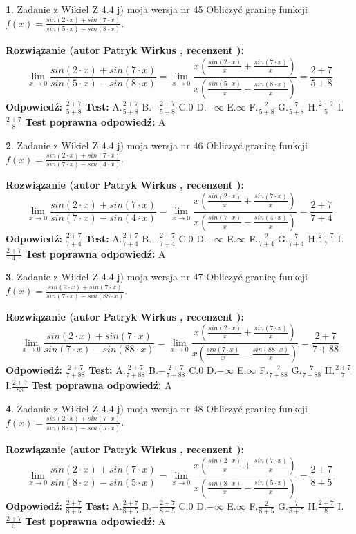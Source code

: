\documentclass[12pt, a4paper]{article}
\theoremstyle{definition} %
\newtheorem{zad}{}
\newcommand{\zadStart}[1]{\begin{zad}#1\newline}
\newcommand{\zadStop}{\end{zad}}
\newcommand{\rozwStart}[2]{\noindent \textbf{Rozwiązanie (autor #1 , recenzent #2): }\newline}
\newcommand{\rozwStop}{\newline}
\newcommand{\odpStart}{\noindent \textbf{Odpowiedź:}\newline}
\newcommand{\odpStop}{\newline}
\newcommand{\testStart}{\noindent \textbf{Test:}\newline}
\newcommand{\testStop}{\newline}
\newcommand{\kluczStart}{\noindent \textbf{Test poprawna odpowiedź:}\newline}
\newcommand{\kluczStop}{\newline}
\begin{document}
\zadStart{Zadanie z Wikieł Z 4.4 j) moja wersja nr 45}
Obliczyć granicę funkcji $f(x)=\frac{sin(2\cdot x) +sin(7\cdot x)}{sin(5\cdot x) -sin(8\cdot x)}$.
\zadStop
\rozwStart{Patryk Wirkus}{}
$$\lim\limits_{x\to 0}\frac{sin(2\cdot x) +sin(7\cdot x)}{sin(5\cdot x) -sin(8\cdot x)}=\lim\limits_{x\to 0}\frac{x(\frac{sin(2\cdot x)}{x}+\frac{sin(7\cdot x)}{x})}{x(\frac{sin(5\cdot x)}{x}-\frac{sin(8\cdot x)}{x})}=\frac{2+7}{5+8}$$
\rozwStop
\odpStart
$\frac{2+7}{5+8}$
\odpStop
\testStart
A.$\frac{2+7}{5+8}$
B.$-\frac{2+7}{5+8}$
C.$0$
D.$-\infty$
E.$\infty$
F.$\frac{2}{5+8}$
G.$\frac{7}{5+8}$
H.$\frac{2+7}{5}$
I.$\frac{2+7}{8}$
\testStop
\kluczStart
A
\kluczStop



\zadStart{Zadanie z Wikieł Z 4.4 j) moja wersja nr 46}
Obliczyć granicę funkcji $f(x)=\frac{sin(2\cdot x) +sin(7\cdot x)}{sin(7\cdot x) -sin(4\cdot x)}$.
\zadStop
\rozwStart{Patryk Wirkus}{}
$$\lim\limits_{x\to 0}\frac{sin(2\cdot x) +sin(7\cdot x)}{sin(7\cdot x) -sin(4\cdot x)}=\lim\limits_{x\to 0}\frac{x(\frac{sin(2\cdot x)}{x}+\frac{sin(7\cdot x)}{x})}{x(\frac{sin(7\cdot x)}{x}-\frac{sin(4\cdot x)}{x})}=\frac{2+7}{7+4}$$
\rozwStop
\odpStart
$\frac{2+7}{7+4}$
\odpStop
\testStart
A.$\frac{2+7}{7+4}$
B.$-\frac{2+7}{7+4}$
C.$0$
D.$-\infty$
E.$\infty$
F.$\frac{2}{7+4}$
G.$\frac{7}{7+4}$
H.$\frac{2+7}{7}$
I.$\frac{2+7}{4}$
\testStop
\kluczStart
A
\kluczStop



\zadStart{Zadanie z Wikieł Z 4.4 j) moja wersja nr 47}
Obliczyć granicę funkcji $f(x)=\frac{sin(2\cdot x) +sin(7\cdot x)}{sin(7\cdot x) -sin(88\cdot x)}$.
\zadStop
\rozwStart{Patryk Wirkus}{}
$$\lim\limits_{x\to 0}\frac{sin(2\cdot x) +sin(7\cdot x)}{sin(7\cdot x) -sin(88\cdot x)}=\lim\limits_{x\to 0}\frac{x(\frac{sin(2\cdot x)}{x}+\frac{sin(7\cdot x)}{x})}{x(\frac{sin(7\cdot x)}{x}-\frac{sin(88\cdot x)}{x})}=\frac{2+7}{7+88}$$
\rozwStop
\odpStart
$\frac{2+7}{7+88}$
\odpStop
\testStart
A.$\frac{2+7}{7+88}$
B.$-\frac{2+7}{7+88}$
C.$0$
D.$-\infty$
E.$\infty$
F.$\frac{2}{7+88}$
G.$\frac{7}{7+88}$
H.$\frac{2+7}{7}$
I.$\frac{2+7}{88}$
\testStop
\kluczStart
A
\kluczStop



\zadStart{Zadanie z Wikieł Z 4.4 j) moja wersja nr 48}
Obliczyć granicę funkcji $f(x)=\frac{sin(2\cdot x) +sin(7\cdot x)}{sin(8\cdot x) -sin(5\cdot x)}$.
\zadStop
\rozwStart{Patryk Wirkus}{}
$$\lim\limits_{x\to 0}\frac{sin(2\cdot x) +sin(7\cdot x)}{sin(8\cdot x) -sin(5\cdot x)}=\lim\limits_{x\to 0}\frac{x(\frac{sin(2\cdot x)}{x}+\frac{sin(7\cdot x)}{x})}{x(\frac{sin(8\cdot x)}{x}-\frac{sin(5\cdot x)}{x})}=\frac{2+7}{8+5}$$
\rozwStop
\odpStart
$\frac{2+7}{8+5}$
\odpStop
\testStart
A.$\frac{2+7}{8+5}$
B.$-\frac{2+7}{8+5}$
C.$0$
D.$-\infty$
E.$\infty$
F.$\frac{2}{8+5}$
G.$\frac{7}{8+5}$
H.$\frac{2+7}{8}$
I.$\frac{2+7}{5}$
\testStop
\kluczStart
A
\kluczStop
\end{document}
